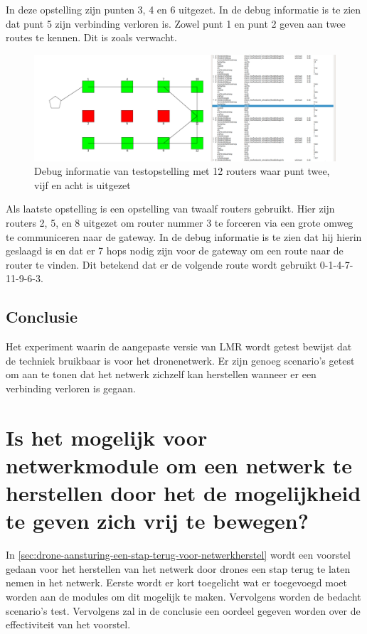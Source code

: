 \documentclass[a4paper, 11pt, oneside]{report}
\begin{document}
In deze opstelling zijn punten 3, 4 en 6 uitgezet. In de debug informatie is te zien dat punt 5 zijn verbinding verloren is.
Zowel punt 1 en punt 2 geven aan twee routes te kennen.
Dit is zoals verwacht.

\begin{figure}[H]
	\begin{center}\includegraphics[width=\linewidth]{Afbeeldingen/testopstelling2_met_twaalf_drie_routers_uit.png}\end{center}
	\caption{Debug informatie van testopstelling met 12 routers waar punt twee, vijf en acht is uitgezet}
	\label{fig:applicatie-testopstelling-gateway-twaalf-routers}
\end{figure}

Als laatste opstelling is een opstelling van twaalf routers gebruikt.
Hier zijn routers 2, 5, en 8 uitgezet om router nummer 3 te forceren via een grote omweg te communiceren naar de gateway.
In de debug informatie is te zien dat hij hierin geslaagd is en dat er 7 hops nodig zijn voor de gateway om een route naar de router te vinden.
Dit betekend dat er de volgende route wordt gebruikt 0-1-4-7-11-9-6-3.

\subsection{Conclusie}

Het experiment waarin de aangepaste versie van LMR wordt getest bewijst dat de techniek bruikbaar is voor het dronenetwerk.
Er zijn genoeg scenario's getest om aan te tonen dat het netwerk zichzelf kan herstellen wanneer er een verbinding verloren is gegaan.

\section{Is het mogelijk voor netwerkmodule om een netwerk te herstellen door het de mogelijkheid te geven zich vrij te bewegen?}
\label{experimenten:herstelnetwerk}

In \autoref{sec:drone-aansturing-een-stap-terug-voor-netwerkherstel} wordt een voorstel gedaan voor het herstellen van het netwerk door drones een stap terug te laten nemen in het netwerk. Eerste wordt er kort toegelicht wat er toegevoegd moet worden aan de modules om dit mogelijk te maken. Vervolgens worden de bedacht scenario's test. Vervolgens zal in de conclusie een oordeel gegeven worden over de effectiviteit van het voorstel.
\end{document}
